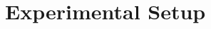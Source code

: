 \documentclass[runningheads]{llncs}
\begin{document}







\section{Experimental Setup}
\end{document}
